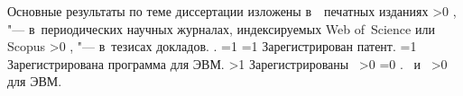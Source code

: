 {\begin{refsection}
        \nocite{*}%
        {\publications} Основные результаты по теме диссертации изложены в~~печатных изданиях
        \ifnum \value{citeauthorscopuswos}>0%
            ,  "--- в~периодических научных журналах, индексируемых Web of~Science или Scopus\sloppy%
        \fi%
        \ifnum \value{citeauthorconf}>0%
            ,  "--- в~тезисах докладов.
        \else%
            .
        \fi%
        \ifnum \value{citeregistered}=1%
            \ifnum \value{citeauthorpatent}=1%
                Зарегистрирован  патент.
            \fi%
            \ifnum \value{citeauthorprogram}=1%
                Зарегистрирована  программа для ЭВМ.
            \fi%
        \fi%
        \ifnum \value{citeregistered}>1%
            Зарегистрированы\ %
            \ifnum \value{citeauthorpatent}>0%
            \sloppy%
            \ifnum \value{citeauthorprogram}=0 . \else \ и~\fi%
            \fi%
            \ifnum \value{citeauthorprogram}>0%
             для ЭВМ.
            \fi%
        \fi%
    \end{refsection}%
    \begin{refsection}

    \end{refsection}%
}

